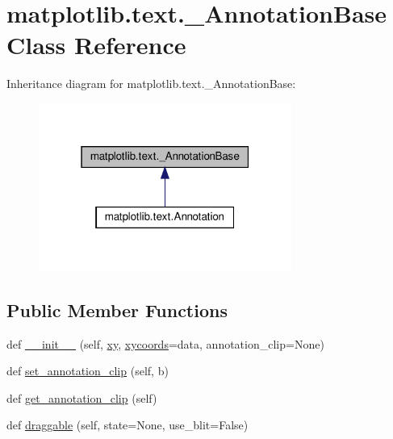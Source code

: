 \hypertarget{classmatplotlib_1_1text_1_1__AnnotationBase}{}\section{matplotlib.\+text.\+\_\+\+Annotation\+Base Class Reference}
\label{classmatplotlib_1_1text_1_1__AnnotationBase}


Inheritance diagram for matplotlib.\+text.\+\_\+\+Annotation\+Base\+:
\nopagebreak
\begin{figure}[H]
\begin{center}
\leavevmode
\includegraphics[width=235pt]{classmatplotlib_1_1text_1_1__AnnotationBase__inherit__graph}
\end{center}
\end{figure}
\subsection*{Public Member Functions}
\begin{DoxyCompactItemize}
\item 
def \hyperlink{classmatplotlib_1_1text_1_1__AnnotationBase_a2785f1493dbd8ead9679594d220d6cbc}{\+\_\+\+\_\+init\+\_\+\+\_\+} (self, \hyperlink{classmatplotlib_1_1text_1_1__AnnotationBase_ac9c32848102bb1318fba1c9497534435}{xy}, \hyperlink{classmatplotlib_1_1text_1_1__AnnotationBase_aadf45788135e13bec1ebe497a5f95274}{xycoords}=\textquotesingle{}data\textquotesingle{}, annotation\+\_\+clip=None)
\item 
def \hyperlink{classmatplotlib_1_1text_1_1__AnnotationBase_a3fb832febdfbaf0f6c30382765374e15}{set\+\_\+annotation\+\_\+clip} (self, b)
\item 
def \hyperlink{classmatplotlib_1_1text_1_1__AnnotationBase_a1a3832aa3aa7251d398bb7688d47741f}{get\+\_\+annotation\+\_\+clip} (self)
\item 
def \hyperlink{classmatplotlib_1_1text_1_1__AnnotationBase_a4dfd997cf1adc9790f8e9c1d7809550f}{draggable} (self, state=None, use\+\_\+blit=False)
\end{DoxyCompactItemize}
